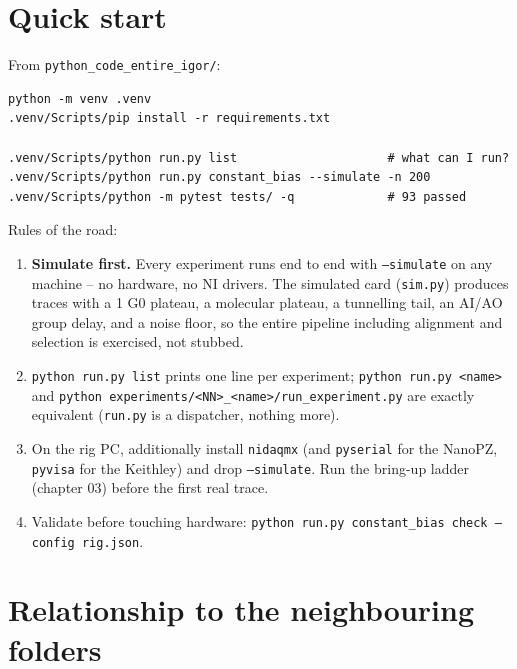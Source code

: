 \section{Quick start}

From \texttt{python\_\discretionary{}{}{}code\_\discretionary{}{}{}entire\_\discretionary{}{}{}igor/\discretionary{}{}{}}:

\begin{lstlisting}[style=out]
python -m venv .venv
.venv/Scripts/pip install -r requirements.txt

.venv/Scripts/python run.py list                     # what can I run?
.venv/Scripts/python run.py constant_bias --simulate -n 200
.venv/Scripts/python -m pytest tests/ -q             # 93 passed
\end{lstlisting}

Rules of the road:

\begin{enumerate}[leftmargin=*]
\item \textbf{Simulate first.} Every experiment runs end to end with \texttt{--simulate} on any machine -- no hardware, no NI drivers. The simulated card (\texttt{sim.\discretionary{}{}{}py}) produces traces with a 1 G0 plateau, a molecular plateau, a tunnelling tail, an AI/AO group delay, and a noise floor, so the entire pipeline including alignment and selection is exercised, not stubbed.
\item \texttt{python run.\discretionary{}{}{}py list} prints one line per experiment; \texttt{python run.\discretionary{}{}{}py <name>} and \texttt{python experiments/\discretionary{}{}{}<NN>\_\discretionary{}{}{}<name>/\discretionary{}{}{}run\_\discretionary{}{}{}experiment.\discretionary{}{}{}py} are exactly equivalent (\texttt{run.\discretionary{}{}{}py} is a dispatcher, nothing more).
\item On the rig PC, additionally install \texttt{nidaqmx} (and \texttt{pyserial} for the NanoPZ, \texttt{pyvisa} for the Keithley) and drop \texttt{--simulate}. Run the bring-up ladder (chapter 03) before the first real trace.
\item Validate before touching hardware: \texttt{python run.\discretionary{}{}{}py constant\_\discretionary{}{}{}bias check --config rig.\discretionary{}{}{}json}.
\end{enumerate}

\section{Relationship to the neighbouring folders}

